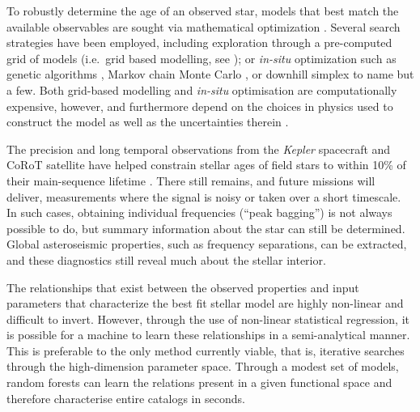 \documentclass[manuscript]{aastex}
\begin{document}
To robustly determine the age of an observed star, models that best match the available observables are sought via mathematical optimization \citep{1994ApJ...427.1013B}. Several search strategies have been employed, including exploration through a pre-computed grid of models (i.e.~grid based modelling, see \citealt{2011ApJ...730...63G, 2014ApJS..210....1C}); or \emph{in-situ} optimization such as genetic algorithms \citep{2014ApJS..214...27M}, Markov chain Monte Carlo \citep{2012MNRAS.427.1847B}, or downhill simplex \citep{2013ApJS..208....4P} to name but a few. Both grid-based modelling and \emph{in-situ} optimisation are computationally expensive, however, and furthermore depend on the choices in physics used to construct the model as well as the uncertainties therein \citep{2014A&A...569A..21L}. 

The precision and long temporal observations from the \emph{Kepler} spacecraft and CoRoT satellite have helped constrain stellar ages of field stars to within 10\% of their main-sequence lifetime \citep{2015MNRAS.452.2127S}. There still remains, and future missions will deliver, measurements where the signal is noisy or taken over a short timescale. In such cases, obtaining individual frequencies (``peak bagging'') is not always possible to do, but summary information about the star can still be determined. Global asteroseismic properties, such as frequency separations, can be extracted, and these diagnostics still reveal much about the stellar interior. 

The relationships that exist between the observed properties and input parameters that characterize the best fit stellar model are highly non-linear and difficult to invert.  However, through the use of non-linear statistical regression, it is possible for a machine to learn these relationships in a semi-analytical manner. This is preferable to the only method currently viable, that is, iterative searches through the high-dimension parameter space. Through a modest set of models, random forests can learn the relations present in a given functional space and therefore characterise entire catalogs in seconds.  %
\end{document}
